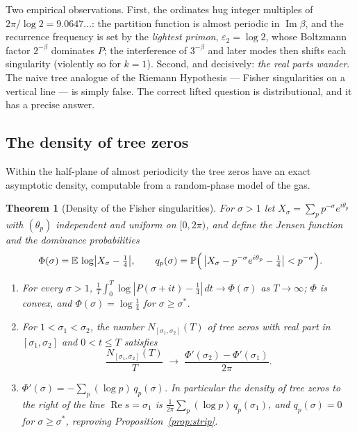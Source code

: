 \documentclass[11pt]{article}
\numberwithin{equation}{section}
\theoremstyle{plain}
\newtheorem{theorem}{Theorem}[section]
\theoremstyle{definition}
\theoremstyle{remark}
\begin{document}
Two empirical observations. First, the ordinates hug integer multiples of
$2\pi/\log 2 = 9.0647\dots$: the partition function is almost periodic in
$\operatorname{Im}\beta$, and the recurrence frequency is set by the \emph{lightest
primon}, $\varepsilon_2 = \log 2$, whose Boltzmann factor $2^{-\beta}$ dominates $P$;
the interference of $3^{-\beta}$ and later modes then shifts each singularity
(violently so for $k=1$). Second, and decisively: \emph{the real parts wander}. The
naive tree analogue of the Riemann Hypothesis --- Fisher singularities on a vertical
line --- is simply false. The correct lifted question is distributional, and it has a
precise answer.

\subsection{The density of tree zeros}\label{sec:density}

Within the half-plane of almost periodicity the tree zeros have an exact asymptotic
density, computable from a random-phase model of the gas.

\begin{theorem}[Density of the Fisher singularities]\label{thm:density}
For $\sigma > 1$ let $X_\sigma = \sum_p p^{-\sigma} e^{i\theta_p}$ with $(\theta_p)$
independent and uniform on $[0, 2\pi)$, and define the \emph{Jensen function} and the
\emph{dominance probabilities}
\[
\Phi(\sigma) = \mathbb{E}\,\log\bigl|X_\sigma - \tfrac14\bigr|,
\qquad
q_p(\sigma) = \mathbb{P}\Bigl(\,\bigl|X_\sigma - p^{-\sigma}e^{i\theta_p} -
\tfrac14\bigr| < p^{-\sigma}\Bigr).
\]
\begin{enumerate}
\item[(i)] For every $\sigma > 1$,
$\frac1T \int_0^T \log|P(\sigma + it) - \tfrac14|\,dt \to \Phi(\sigma)$ as
$T \to \infty$; $\Phi$ is convex, and $\Phi(\sigma) = \log\tfrac14$ for
$\sigma \ge \sigma^{*}$.
\item[(ii)] For $1 < \sigma_1 < \sigma_2$, the number $N_{[\sigma_1,\sigma_2]}(T)$ of
tree zeros with real part in $[\sigma_1, \sigma_2]$ and $0 < t \le T$ satisfies
\[
\frac{N_{[\sigma_1,\sigma_2]}(T)}{T} \;\longrightarrow\;
\frac{\Phi'(\sigma_2) - \Phi'(\sigma_1)}{2\pi}.
\]
\item[(iii)] $\Phi'(\sigma) = -\sum_p (\log p)\, q_p(\sigma)$. In particular the
density of tree zeros to the right of the line $\operatorname{Re} s = \sigma_1$ is
$\frac{1}{2\pi}\sum_p (\log p)\, q_p(\sigma_1)$, and $q_p(\sigma) = 0$ for
$\sigma \ge \sigma^{*}$, reproving Proposition~\ref{prop:strip}.
\end{enumerate}
\end{theorem}
\end{document}

